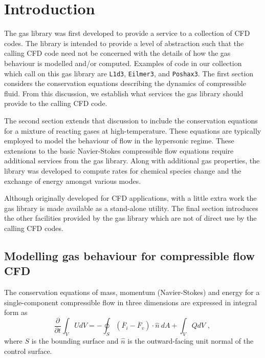 \chapter{Introduction}
The gas library was first developed to provide a service
to a collection of CFD codes.
The library is intended to provide a level of abstraction
such that the calling CFD code need not be concerned
with the details of how the gas behaviour is modelled
and/or computed.
Examples of code in our collection which call on this
gas library are \texttt{L1d3}\cite{jacobs_L1d}, 
\texttt{Eilmer3}\cite{jacobs_etal_2010}, and
\texttt{Poshax3}.
The first section considers the conservation equations
describing the dynamics of compressible fluid.
From this discussion, we establish what services the
gas library should provide to the calling CFD code.

The second section extends that discussion to include
the conservation equations for a mixture of reacting
gases at high-temperature.
These equations are typically employed to model the 
behaviour of flow in the hypersonic regime.
These extensions to the basic Navier-Stokes compressible
flow equations require additional services from the
gas library.
Along with additional gas properties, the library was
developed to compute rates for chemical species change
and the exchange of energy amongst various modes.

Although originally developed for CFD applications,
with a little extra work the gas library is made
available as a stand-alone utility.
The final section introduces the other facilities
provided by the gas library which are not of direct
use by the calling CFD codes.

\section{Modelling gas behaviour for compressible flow CFD}
\label{sec:cfeqns}
The conservation equations of mass, momentum (Navier-Stokes)
and energy for a single-component compressible flow in
three dimensions are expressed in integral form as
\begin{equation}
 \frac{\partial}{\partial t} \int_{V} U dV = - \oint_{S} \left ( \overline{F}_{i} - \overline{F}_{v} \right ) \cdot \hat{n}~dA + \int_{V} Q dV \text{ , }
 \label{eq:conservation}
\end{equation}
where $S$ is the bounding surface and $\hat{n}$ is the outward-facing unit normal of the control surface.

